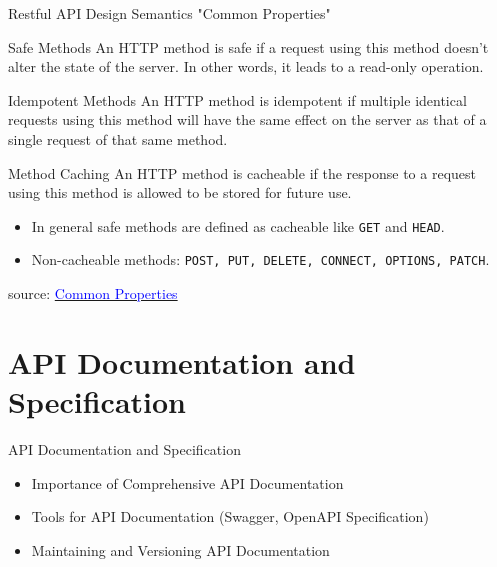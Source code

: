 \documentclass{beamer}
\newcommand{\code}[1]{\colorbox{codegray}{\texttt{#1}}}
\begin{document}
\begin{frame}[t]{Restful API Design Semantics "Common Properties"}
	\scriptsize
	\begin{block}{Safe Methods}		
		An HTTP method is safe if a request using this method doesn’t alter the state of the server. In other words, it leads to a read-only operation.	
	\end{block}
		
	\begin{block}{Idempotent Methods}	
		An HTTP method is idempotent if multiple identical requests using this method will have the same effect on the server as that of a single request of that same method.
	\end{block}
	
	\begin{block}{Method Caching}
		An HTTP method is cacheable if the response to a request using this method is allowed to be stored for future use. 
		\begin{itemize}
			\item In general safe methods are defined as cacheable like \code{GET} and \code{HEAD}.
			\item Non-cacheable methods: \code{POST, PUT, DELETE, CONNECT, OPTIONS, PATCH}.
		\end{itemize}			
		
	\end{block}
	
	\vspace{10mm}
	\tiny source: \href{https://learning.mlytics.com/the-internet/http-request-methods} {\textcolor{blue}{Common Properties}} 
\end{frame}

\section{API Documentation and Specification}
\begin{frame}{API Documentation and Specification}
  \begin{itemize}
    \item Importance of Comprehensive API Documentation
    \item Tools for API Documentation (Swagger, OpenAPI Specification)
    \item Maintaining and Versioning API Documentation
  \end{itemize}
\end{frame}
\end{document}
